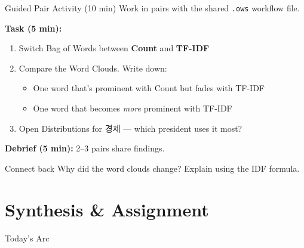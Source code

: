\documentclass[aspectratio=169,11pt]{beamer}
\begin{document}
\begin{frame}{Guided Pair Activity (10 min)}
    Work in pairs with the shared \texttt{.ows} workflow file.

    \vspace{0.4cm}

    \textbf{Task (5 min):}
    \begin{enumerate}
        \item Switch Bag of Words between \textbf{Count} and \textbf{TF-IDF}
        \item Compare the Word Clouds. Write down:
        \begin{itemize}
            \item One word that's prominent with Count but fades with TF-IDF
            \item One word that becomes \textit{more} prominent with TF-IDF
        \end{itemize}
        \item Open Distributions for 경제 --- which president uses it most?
    \end{enumerate}

    \vspace{0.4cm}

    \textbf{Debrief (5 min):} 2--3 pairs share findings.

    \vspace{0.2cm}

    \begin{alertblock}{Connect back}
        Why did the word clouds change? Explain using the IDF formula.
    \end{alertblock}
\end{frame}

\section{Synthesis \& Assignment}

\begin{frame}{Today's Arc}
    \begin{center}
    \end{center}
\end{frame}
\end{document}
